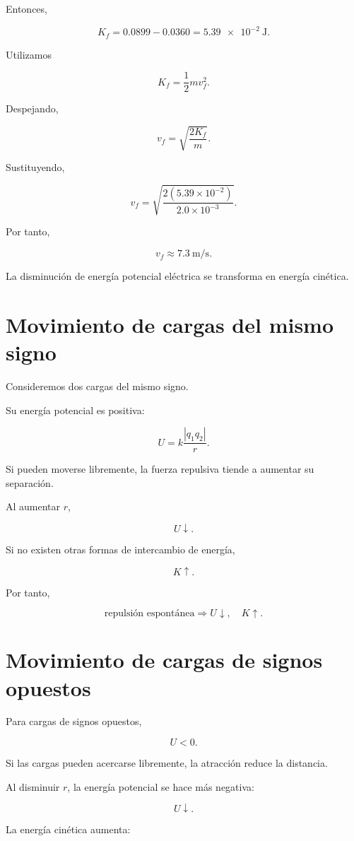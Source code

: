 Entonces,

\[
K_f=0.0899-0.0360
=\SI{5.39e-2}{\joule}.
\]

Utilizamos

\[
K_f=\frac12mv_f^2.
\]

Despejando,

\[
v_f=\sqrt{\frac{2K_f}{m}}.
\]

Sustituyendo,

\[
v_f
=
\sqrt{
\frac{2(5.39\times10^{-2})}
{2.0\times10^{-3}}
}.
\]

Por tanto,

\[
\boxed{v_f\approx\SI{7.3}{\metre\per\second}}.
\]

La disminución de energía potencial eléctrica se transforma en energía cinética.


\section{Movimiento de cargas del mismo signo}

Consideremos dos cargas del mismo signo.

Su energía potencial es positiva:

\[
U=k\frac{|q_1q_2|}{r}.
\]

Si pueden moverse libremente, la fuerza repulsiva tiende a aumentar su separación.

Al aumentar \(r\),

\[
U\downarrow.
\]

Si no existen otras formas de intercambio de energía,

\[
K\uparrow.
\]

Por tanto,

\[
\boxed{
\text{repulsión espontánea}
\Longrightarrow
U\downarrow,\quad K\uparrow
}.
\]


\section{Movimiento de cargas de signos opuestos}

Para cargas de signos opuestos,

\[
U<0.
\]

Si las cargas pueden acercarse libremente, la atracción reduce la distancia.

Al disminuir \(r\), la energía potencial se hace más negativa:

\[
U\downarrow.
\]

La energía cinética aumenta:

